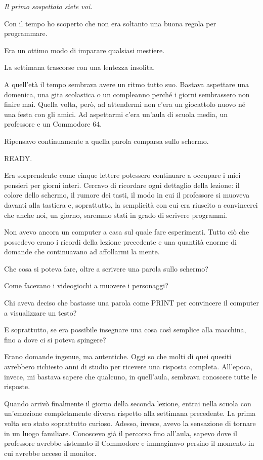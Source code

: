 \documentclass{article}
\begin{document}
\emph{{\textquotedbl}Il primo sospettato siete voi.{\textquotedbl}}

Con il tempo ho scoperto che non era soltanto una buona regola per programmare.

Era un ottimo modo di imparare qualsiasi mestiere.

La settimana trascorse con una lentezza insolita.

A quell'età il tempo sembrava avere un ritmo tutto suo. Bastava aspettare una domenica, una gita scolastica o un
compleanno perché i giorni sembrassero non finire mai. Quella volta, però, ad attendermi non c'era un giocattolo nuovo
né una festa con gli amici. Ad aspettarmi c'era un'aula di scuola media, un professore e un Commodore 64.

Ripensavo continuamente a quella parola comparsa sullo schermo.

READY.

Era sorprendente come cinque lettere potessero continuare a occupare i miei pensieri per giorni interi. Cercavo di
ricordare ogni dettaglio della lezione: il colore dello schermo, il rumore dei tasti, il modo in cui il professore si
muoveva davanti alla tastiera e, soprattutto, la semplicità con cui era riuscito a convincerci che anche noi, un
giorno, saremmo stati in grado di scrivere programmi.

Non avevo ancora un computer a casa sul quale fare esperimenti. Tutto ciò che possedevo erano i ricordi della lezione
precedente e una quantità enorme di domande che continuavano ad affollarmi la mente.

Che cosa si poteva fare, oltre a scrivere una parola sullo schermo?

Come facevano i videogiochi a muovere i personaggi?

Chi aveva deciso che bastasse una parola come PRINT per convincere il computer a visualizzare un testo?

E soprattutto, se era possibile insegnare una cosa così semplice alla macchina, fino a dove ci si poteva spingere?

Erano domande ingenue, ma autentiche. Oggi so che molti di quei quesiti avrebbero richiesto anni di studio per ricevere
una risposta completa. All'epoca, invece, mi bastava sapere che qualcuno, in quell'aula, sembrava conoscere tutte le
risposte.

Quando arrivò finalmente il giorno della seconda lezione, entrai nella scuola con un'emozione completamente diversa
rispetto alla settimana precedente. La prima volta ero stato soprattutto curioso. Adesso, invece, avevo la sensazione
di tornare in un luogo familiare. Conoscevo già il percorso fino all'aula, sapevo dove il professore avrebbe sistemato
il Commodore e immaginavo persino il momento in cui avrebbe acceso il monitor.
\end{document}
